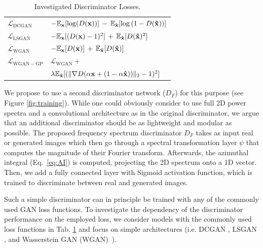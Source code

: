 \documentclass[letterpaper]{article} %
\begin{document}
\begin{table}
    \caption{Investigated Discriminator Losses.}
    \label{tab0}
    \centering
    \begin{tabular}{ll}
    \toprule
    $\mathcal{L}_{\mathrm{DCGAN}}$& $- \mathbb{E}_{{\bf x}%
    }
    [\mathrm{log}(D({\bf x}))]\,-\,
\mathbb{E}_{{\bf \hat{x}}%
}
[\mathrm{log}\left(1-D({\bf \hat{x}})\right)]$\\
$\mathcal{L}_{\mathrm{LSGAN}}$& $- \mathbb{E}_{{\bf x}%
}[(D({\bf x})-1)^2]\,+\,
\mathbb{E}_{{\bf \hat{x}}%
}
[D({\bf \hat{x}})^2]$\\
$\mathcal{L}_{\mathrm{WGAN}}$& $- \mathbb{E}_{{\bf x}%
}[D({\bf x})]\,+\,
\mathbb{E}_{{\bf \hat{x}}
}
[D({\bf \hat{x}})]$\\
$\mathcal{L}_{\mathrm{WGAN-GP}}$& $\mathcal{L}_{\mathrm{WGAN}}+$\\
&$\lambda \mathbb{E}_{{\bf \hat{x}} %
}[(\|\nabla D(\alpha {\bf x}+(1-\alpha {\bf \hat{x}}))\|_2-1)^2] $\\

    \bottomrule

    \end{tabular}
    \end{table}

We propose to use a second discriminator network ($D_F$) for this purpose (see Figure \ref{fig:training}).
While one could obviously consider to use full 2D power spectra and a convolutional architecture as in the original discriminator, we argue that an additional discriminator should be as lightweight and modular as possible.
The proposed frequency spectrum discriminator $D_F$ takes as input real or generated images which then go through a spectral transformation layer $\psi$ that computes the magnitude of their Fourier transform.
Afterwards, the azimuthal integral (Eq.~\eqref{eq:AI}) is computed, projecting the 2D spectrum onto a 1D vector. Then, we add a fully connected layer with Sigmoid activation function, which is trained to discriminate between real and generated images.

Such a simple discriminator can in principle be trained with any of the commonly used GAN loss functions. To investigate the dependency of the discriminator performance on the employed loss, we consider models with the commonly used loss functions in Tab. \ref{tab0} and focus on simple architectures (i.e. DCGAN \cite{radford2015dcgan}, LSGAN \cite{mao2017least}, and Wasserstein GAN (WGAN)~\cite{gulrajani2017wgan,gulrajani2017improved}).
\end{document}
